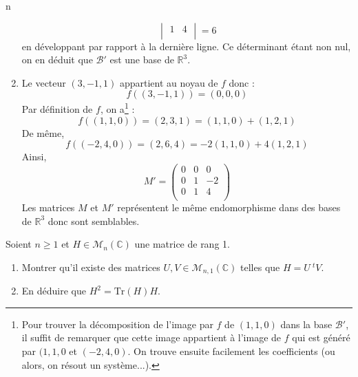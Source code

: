 n\documentclass[a4paper,10pt]{report}
\begin{document}
\begin{enumerate}
$$\begin{vmatrix}
 1 & 4\\
\end{vmatrix} = 6 $$
en développant par rapport à la dernière ligne. Ce déterminant étant non nul, on en déduit que $\mathcal{B}'$ est une base de $\mathbb{R}^3$.
\item Le vecteur $(3,-1,1)$ appartient au noyau de $f$ donc :
$$ f((3,-1,1))=(0,0,0)$$
Par définition de $f$, on a\footnote{Pour trouver la décomposition de l'image par $f$ de $(1,1,0)$ dans la base $\mathcal{B}'$, il suffit de remarquer que cette image appartient à l'image de $f$ qui est généré par $(1,1,0$ et $(-2,4,0)$. On trouve ensuite facilement les coefficients (ou alors, on résout un système...).} :
$$ f((1,1,0))=(2,3,1) = (1,1,0) + (1,2,1)$$
De même,
$$ f((-2,4,0))=(2,6,4) = -2(1,1,0) + 4(1,2,1) $$
Ainsi,
$$ M' = \begin{pmatrix}
0 & 0 & 0 \\
0 & 1 & -2 \\
0 & 1 & 4 \\
\end{pmatrix}$$
Les matrices $M$ et $M'$ représentent le même endomorphisme dans des bases de $\mathbb{R}^3$ donc sont semblables.
\end{enumerate}

\begin{Exa} Soient $n \geq 1$ et $H \in \mathcal{M}_n(\mathbb{C})$ une matrice de rang 1.
    \begin{enumerate}
      \item
        Montrer qu'il existe des matrices $U,V \in \mathcal{M}_{n,1}(\mathbb{C})$ telles que $H = U ~^tV$.
      \item En déduire que $H^2 = \textrm{Tr}(H)H$.
 \end{enumerate}
\end{Exa}

\corr 
\end{document}
